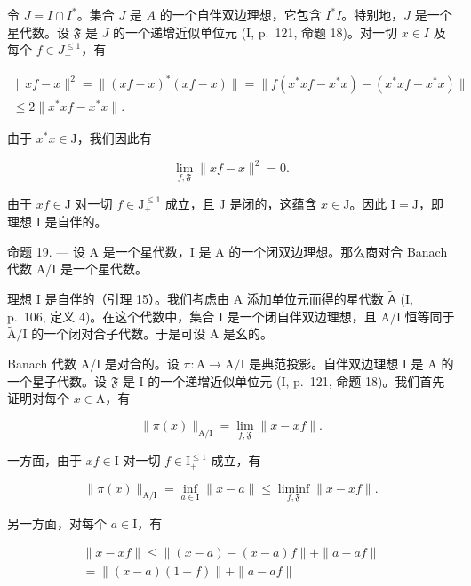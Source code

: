 令 \(J = I \cap I^*\)。集合 \(J\) 是 \(A\) 的一个自伴双边理想，它包含 \(I^*I\)。特别地，\(J\) 是一个星代数。设 \(\mathfrak{F}\) 是 \(J\) 的一个递增近似单位元 (I, p.~121, 命题 18)。对一切 \(x \in I\) 及每个 \(f \in J_{+}^{\leqslant 1}\)，有

\[
\begin{array}{c} \| x f - x \| ^ {2} = \| (x f - x) ^ {*} (x f - x) \| = \| f (x ^ {*} x f - x ^ {*} x) - (x ^ {*} x f - x ^ {*} x) \| \\ \leqslant 2 \| x ^ {*} x f - x ^ {*} x \|. \end{array}
\]

由于 \(x^{*}x\in \mathrm{J}\)，我们因此有

\[
\lim _ {f, \mathfrak {F}} \| x f - x \| ^ {2} = 0.
\]

由于 \(xf \in \mathrm{J}\) 对一切 \(f \in \mathrm{J}_{+}^{\leqslant 1}\) 成立，且 \(\mathrm{J}\) 是闭的，这蕴含 \(x \in \mathrm{J}\)。因此 \(\mathrm{I} = \mathrm{J}\)，即理想 \(\mathrm{I}\) 是自伴的。

命题 19. --- 设 A 是一个星代数，I 是 A 的一个闭双边理想。那么商对合 Banach 代数 A/I 是一个星代数。

理想 I 是自伴的（引理 15）。我们考虑由 A 添加单位元而得的星代数 \(\widetilde{\mathsf{A}}\) (I, p.~106, 定义 4)。在这个代数中，集合 I 是一个闭自伴双边理想，且 A/I 恒等同于 \(\widetilde{\mathrm{A}}/\mathrm{I}\) 的一个闭对合子代数。于是可设 A 是幺的。

Banach 代数 A/I 是对合的。设 \(\pi\colon\mathrm{A}\to\mathrm{A}/\mathrm{I}\) 是典范投影。自伴双边理想 I 是 A 的一个星子代数。设 \(\mathfrak{F}\) 是 I 的一个递增近似单位元 (I, p.~121, 命题 18)。我们首先证明对每个 \(x\in\mathrm{A}\)，有

\[
\| \pi (x) \| _ {\mathrm{A/I}} = \lim _ {f, \mathfrak {F}} \| x - x f \|.\tag{6}
\]

一方面，由于 \(xf \in \mathrm{I}\) 对一切 \(f \in \mathrm{I}_{+}^{\leqslant 1}\) 成立，有

\[
\| \pi (x) \| _ {\mathrm{A} / \mathrm{I}} = \inf _ {a \in \mathrm{I}} \| x - a \| \leqslant \operatorname * {l i m i n f} _ {f, \mathfrak {F}} \| x - x f \|.
\]

另一方面，对每个 \(a \in \mathrm{I}\)，有

\[
\begin{array}{c} \| x - x f \| \leqslant \| (x - a) - (x - a) f \| + \| a - a f \| \\ = \| (x - a) (1 - f) \| + \| a - a f \| \end{array}
\]

